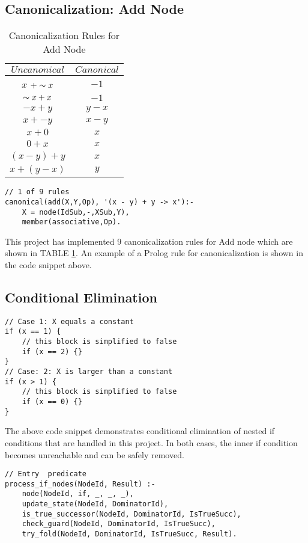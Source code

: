\subsection{Canonicalization: Add Node}
\begin{table}
    \centering
    \fontsize{9pt}{9pt}
    \begin{tabular}{|c|c|}
        \hline
        $Uncanonical$ & $Canonical$ \\
        \hline
        $x$ $+ \thicksim x$ & $-1$ \\
        $\thicksim x + x$ & $-1$ \\
        $-x + y$ & $y - x$ \\
        $x + -y$ & $x - y$ \\
        $x + 0$ & $x$ \\
        $0 + x$ & $x$ \\
        $(x - y) + y$ & $x$ \\
        $x + (y - x)$ & $y$ \\
        \hline
    \end{tabular}
    \caption{Canonicalization Rules for Add Node}
    \label{table:addNodeRules}
\end{table} 

\begin{lstlisting}
// 1 of 9 rules
canonical(add(X,Y,Op), '(x - y) + y -> x'):-
    X = node(IdSub,-,XSub,Y),
    member(associative,Op).
\end{lstlisting}

\smallbreak
This project has implemented 9 canonicalization rules for Add node which are shown in TABLE \ref{table:addNodeRules}. 
An example of a Prolog rule for canonicalization is shown in the code snippet above. 

\subsection{Conditional Elimination}
\begin{lstlisting}
// Case 1: X equals a constant
if (x == 1) {
    // this block is simplified to false
    if (x == 2) {}
}
// Case: 2: X is larger than a constant
if (x > 1) {
    // this block is simplified to false
    if (x == 0) {}
}
\end{lstlisting}

The above code snippet demonstrates conditional elimination of nested if conditions that are handled in this project. In both cases, the inner if condition becomes unreachable and can be safely removed. 
\begin{lstlisting}
// Entry  predicate
process_if_nodes(NodeId, Result) :-
    node(NodeId, if, _, _, _),
    update_state(NodeId, DominatorId),
    is_true_successor(NodeId, DominatorId, IsTrueSucc),
    check_guard(NodeId, DominatorId, IsTrueSucc),
    try_fold(NodeId, DominatorId, IsTrueSucc, Result).
\end{lstlisting}

